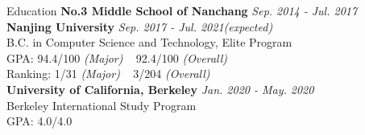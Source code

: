 \documentclass{resume} %
\begin{document}
\vspace{-2pt}
\begin{rSection}{Education}
{\bf No.3 Middle School of Nanchang} \hfill{\em Sep. 2014 - Jul. 2017}\\
{\bf Nanjing University} \hfill {\em Sep. 2017 - Jul. 2021(expected)} \\
B.C. in Computer Science and Technology, Elite Program \\
GPA: 94.4/100 {\em (Major)} ~ 92.4/100 {\em (Overall)}\\
Ranking: 1/31 {\em (Major)} ~ 3/204 {\em (Overall)}\smallskip\\
{\bf University of California, Berkeley} \hfill {\em Jan. 2020 - May. 2020} \\
Berkeley International Study Program
\smallskip\\
GPA: 4.0/4.0
\end{rSection}
\end{document}
